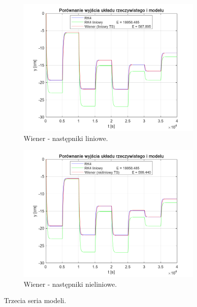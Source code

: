 \begin{figure}[b!]
\begin{subfigure}[b]{0.49\paperwidth}
\centering
\includegraphics[width=\linewidth]{pictures/WienerLinearModel_3}
\caption{Wiener - następniki liniowe.}
\end{subfigure}
\hfill
\begin{subfigure}[b]{0.49\paperwidth}
\centering
\includegraphics[width=\linewidth]{pictures/WienerNonlinearModel_3}
\caption{Wiener - następniki nieliniowe.}
\end{subfigure}

\caption{Trzecia seria modeli.}
\end{figure}

\newpage

